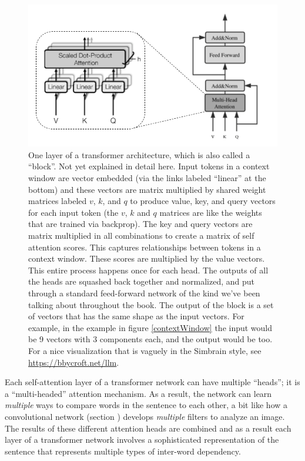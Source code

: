 \begin{figure}[h]
\centering
\includegraphics[scale=.4]{./images/transformerBlock.png}
\caption[Jeff Yoshimi modification of Todo.]{One layer of a transformer architecture, which is also called a ``block''. Not yet explained in detail here. Input tokens in a context window are vector embedded (via the links labeled ``linear'' at the bottom) and these vectors are matrix multiplied by shared weight matrices labeled $v$, $k$, and $q$ to produce value, key, and query vectors for each input token (the $v$, $k$ and $q$ matrices are like the weights that are trained via backprop). The key and query vectors are matrix multiplied in all combinations to create a matrix of self attention scores. This captures relationships between tokens in a context window. These scores are multiplied by the value vectors. This entire process happens once for each head. The outputs of all the heads are squashed back together and normalized, and put through a standard feed-forward network of the kind we've been talking about throughout the book. The output of the block is a set of vectors that has the same shape as the input vectors.  For example, in the example in figure \ref{contextWindow} the input would be 9 vectors with 3 components each, and the output would be too. For a nice visualization that is vaguely in the Simbrain style, see \url{https://bbycroft.net/llm}. }
\label{transformerBlock}
\end{figure}

Each self-attention layer of a transformer network can have multiple ``heads'';  it is a ``multi-headed'' attention mechanism.  As a result, the network can learn \emph{multiple} ways to compare words in the sentence to each other, a bit like how a convolutional network (section ) develops \emph{multiple} filters to analyze an image.  The results of these different attention heads are combined and as a result each layer of a transformer network involves a sophisticated representation of the sentence that represents multiple types of inter-word dependency.

